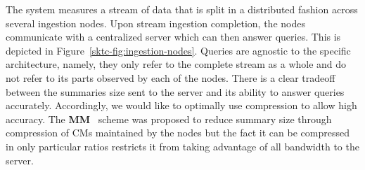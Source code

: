 The system measures a stream of data that is split in a distributed fashion across several ingestion nodes. 
Upon stream ingestion completion, the nodes communicate with a centralized server which can then answer queries. This is depicted in Figure~\ref{sktc-fig:ingestion-nodes}. 
Queries are agnostic to the specific architecture, namely, they only refer to the complete stream as a whole and do not refer to its parts observed by each of the nodes. 
There is a clear tradeoff between the summaries size sent to the server and its ability to answer queries accurately.  
Accordingly, we would like to optimally use compression to allow high accuracy.  The \textbf{MM}~\cite{yang2018elastic} scheme was proposed to reduce summary size through compression of CMs maintained by the nodes but the fact it can be compressed in only particular ratios restricts it from taking advantage of all bandwidth to the server. 


